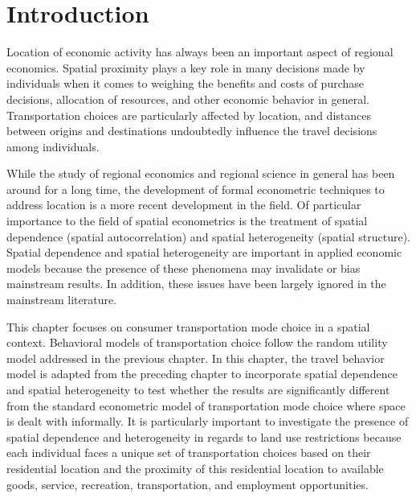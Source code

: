 
\section{Introduction}

Location of economic activity has always been an important aspect of regional economics.  Spatial proximity plays a key role in many decisions made by individuals when it comes to weighing the benefits and costs of purchase decisions, allocation of resources, and other economic behavior in general.  Transportation choices are particularly affected by location, and distances between origins and destinations undoubtedly influence the travel decisions among individuals.  

While the study of regional economics and regional science in general has been around for a long time, the development of formal econometric techniques to address location is a more recent development in the field.  Of particular importance to the field of spatial econometrics is the treatment of spatial dependence (spatial autocorrelation) and spatial heterogeneity (spatial structure).  Spatial dependence and spatial heterogeneity are important in applied economic models because the presence of these phenomena may invalidate or bias mainstream results.  In addition, these issues have been largely ignored in the mainstream literature. \citep{Anselin1988}

This chapter focuses on consumer transportation mode choice in a spatial context.  Behavioral models of transportation choice follow the random utility model addressed in the previous chapter.  In  this chapter, the  travel behavior model is adapted from the preceding chapter to incorporate spatial dependence and spatial heterogeneity to test whether the results are significantly different from the standard econometric model of transportation mode choice where space is dealt with informally.  It is particularly important to investigate the presence of spatial dependence and heterogeneity in regards to land use restrictions because each individual faces a unique set of transportation choices based on their residential location and the proximity of this residential location to available goods, service, recreation, transportation, and employment opportunities.  

